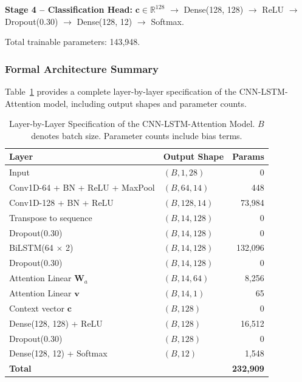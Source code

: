 \documentclass[conference]{IEEEtran}
\begin{document}
\textbf{Stage 4 -- Classification Head:}
$\mathbf{c} \in \mathbb{R}^{128}$ $\to$ Dense(128, 128) $\to$ ReLU
$\to$ Dropout(0.30) $\to$ Dense(128, 12) $\to$ Softmax.

Total trainable parameters: 143,948.

\subsubsection{Formal Architecture Summary}

Table~\ref{tab:arch} provides a complete layer-by-layer specification of the
CNN-LSTM-Attention model, including output shapes and parameter counts.

\begin{table}[htbp]
\centering
\renewcommand{\arraystretch}{1.12}
\caption{Layer-by-Layer Specification of the CNN-LSTM-Attention Model.
         $B$ denotes batch size. Parameter counts include bias terms.}
\label{tab:arch}
\begin{tabular}{p{3.4cm} p{2.2cm} r}
\toprule
\textbf{Layer} & \textbf{Output Shape} & \textbf{Params} \\
\midrule
Input                            & $(B, 1, 28)$   & 0 \\
Conv1D-64 + BN + ReLU + MaxPool  & $(B, 64, 14)$  & 448 \\
Conv1D-128 + BN + ReLU           & $(B, 128, 14)$ & 73,984 \\
Transpose to sequence            & $(B, 14, 128)$ & 0 \\
Dropout(0.30)                    & $(B, 14, 128)$ & 0 \\
BiLSTM(64 $\times$ 2)           & $(B, 14, 128)$ & 132,096 \\
Dropout(0.30)                    & $(B, 14, 128)$ & 0 \\
Attention Linear $\mathbf{W}_a$  & $(B, 14, 64)$  & 8,256 \\
Attention Linear $\mathbf{v}$    & $(B, 14, 1)$   & 65 \\
Context vector $\mathbf{c}$      & $(B, 128)$     & 0 \\
Dense(128, 128) + ReLU           & $(B, 128)$     & 16,512 \\
Dropout(0.30)                    & $(B, 128)$     & 0 \\
Dense(128, 12) + Softmax         & $(B, 12)$      & 1,548 \\
\midrule
\textbf{Total}                   &                & \textbf{232,909} \\
\bottomrule
\end{tabular}
\end{table}
\end{document}
